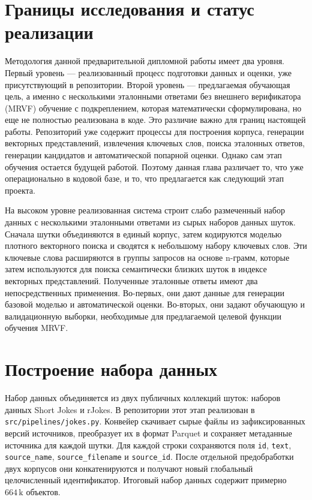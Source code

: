 \section{Границы исследования и статус реализации}

Методология данной предварительной дипломной работы имеет два уровня. Первый уровень --- реализованный процесс подготовки данных и оценки, уже присутствующий в репозитории. Второй уровень --- предлагаемая обучающая цель, а именно с несколькими эталонными ответами без внешнего верификатора (MRVF) обучение с подкреплением, которая математически сформулирована, но еще не полностью реализована в коде. Это различие важно для границ настоящей работы. Репозиторий уже содержит процессы для построения корпуса, генерации векторных представлений, извлечения ключевых слов, поиска эталонных ответов, генерации кандидатов и автоматической попарной оценки. Однако сам этап обучения остается будущей работой. Поэтому данная глава различает то, что уже операционально в кодовой базе, и то, что предлагается как следующий этап проекта.

На высоком уровне реализованная система строит слабо размеченный набор данных с несколькими эталонными ответами из сырых наборов данных шуток. Сначала шутки объединяются в единый корпус, затем кодируются моделью плотного векторного поиска и сводятся к небольшому набору ключевых слов. Эти ключевые слова расширяются в группы запросов на основе n-грамм, которые затем используются для поиска семантически близких шуток в индексе векторных представлений. Полученные эталонные ответы имеют два непосредственных применения. Во-первых, они дают данные для генерации базовой моделью и автоматической оценки. Во-вторых, они задают обучающую и валидационную выборки, необходимые для предлагаемой целевой функции обучения MRVF.

\section{Построение набора данных}

Набор данных объединяется из двух публичных коллекций шуток: наборов данных Short Jokes и rJokes. В репозитории этот этап реализован в \texttt{src/pipelines/jokes.py}. Конвейер скачивает сырые файлы из зафиксированных версий источников, преобразует их в формат Parquet и сохраняет метаданные источника для каждой шутки. Для каждой строки сохраняются поля \texttt{id}, \texttt{text}, \texttt{source\_name}, \texttt{source\_filename} и \texttt{source\_id}. После отдельной предобработки двух корпусов они конкатенируются и получают новый глобальный целочисленный идентификатор. Итоговый набор данных содержит примерно \(664\,\text{k}\) объектов.

